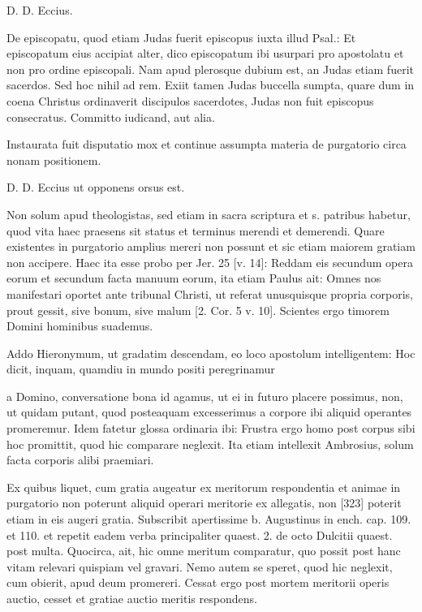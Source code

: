 D. D. Eccius.

De episcopatu, quod etiam Judas fuerit episcopus iuxta illud Psal.: Et episcopatum eius accipiat alter, dico episcopatum ibi usurpari pro apostolatu et non pro ordine episcopali. Nam apud plerosque dubium est, an Judas etiam fuerit sacerdos. Sed hoc nihil ad rem. Exiit tamen Judas buccella sumpta, quare dum in coena Christus ordinaverit discipulos sacerdotes, Judas non fuit episcopus consecratus. Committo iudicand, aut alia.

Instaurata fuit disputatio mox et continue assumpta materia de purgatorio circa nonam positionem.

D. D. Eccius ut opponens orsus est.

Non solum apud theologistas, sed etiam in sacra scriptura et s. patribus habetur, quod vita haec praesens sit status et terminus merendi et demerendi. Quare existentes in purgatorio amplius mereri non possunt et sic etiam maiorem gratiam non accipere. Haec ita esse probo per Jer. 25 [v. 14]: Reddam eis secundum opera eorum et secundum facta manuum eorum, ita etiam Paulus ait: Omnes nos manifestari oportet ante tribunal Christi, ut referat unusquisque propria corporis, prout gessit, sive bonum, sive malum [2. Cor. 5 v. 10]. Scientes ergo timorem Domini hominibus suademus.

Addo Hieronymum, ut gradatim descendam, eo loco apostolum intelligentem: Hoc dicit, inquam, quamdiu in mundo positi peregrinamur

a Domino, conversatione bona id agamus, ut ei in futuro placere possimus, non, ut quidam putant, quod posteaquam excesserimus a corpore ibi aliquid operantes promeremur. Idem fatetur glossa ordinaria ibi: Frustra ergo homo post corpus sibi hoc promittit, quod hic comparare neglexit. Ita etiam intellexit Ambrosius, solum facta corporis alibi praemiari.

Ex quibus liquet, cum gratia augeatur ex meritorum respondentia et animae in purgatorio non poterunt aliquid operari meritorie ex allegatis, non [323] poterit etiam in eis augeri gratia. Subscribit apertissime b. Augustinus in ench. cap. 109. et 110. et repetit eadem verba principaliter quaest. 2. de octo Dulcitii quaest. post multa. Quocirca, ait, hic omne meritum comparatur, quo possit post hanc vitam relevari quispiam vel gravari. Nemo autem se speret, quod hic neglexit, cum obierit, apud deum promereri. Cessat ergo post mortem meritorii operis auctio, cesset et gratiae auctio meritis respondens.

